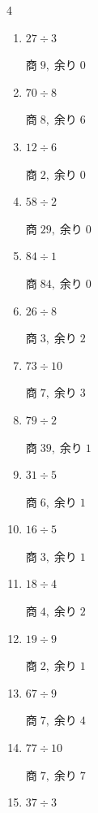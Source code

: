 \begin{multicols}{4}
\begin{enumerate}
  \item $27 \div 3$

        $商\; 9,\; 余り\; 0$

  \item $70 \div 8$

        $商\; 8,\; 余り\; 6$

  \item $12 \div 6$

        $商\; 2,\; 余り\; 0$

  \item $58 \div 2$

        $商\; 29,\; 余り\; 0$

  \item $84 \div 1$

        $商\; 84,\; 余り\; 0$

  \item $26 \div 8$

        $商\; 3,\; 余り\; 2$

  \item $73 \div 10$

        $商\; 7,\; 余り\; 3$

  \item $79 \div 2$

        $商\; 39,\; 余り\; 1$

  \item $31 \div 5$

        $商\; 6,\; 余り\; 1$

\columnbreak %

\resetques

  \item $16 \div 5$

        $商\; 3,\; 余り\; 1$

  \item $18 \div 4$

        $商\; 4,\; 余り\; 2$

  \item $19 \div 9$

        $商\; 2,\; 余り\; 1$

  \item $67 \div 9$

        $商\; 7,\; 余り\; 4$

  \item $77 \div 10$

        $商\; 7,\; 余り\; 7$

  \item $37 \div 3$


\end{enumerate}
\end{multicols}

